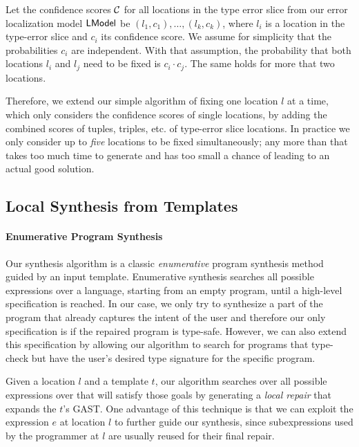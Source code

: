 Let the confidence scores $\mathcal{C}$ for all locations
in the type error slice from our error localization model $\mathsf{LModel}$ be
$(l_1, c_1), \dots, (l_k, c_k)$, where $l_i$ is a location in the type-error
slice and $c_i$ its confidence score. We assume for simplicity
that the probabilities $c_i$ are independent.
With that assumption, the probability that both locations $l_i$ and $l_j$
need to be fixed is $c_i \cdot c_j$. The same holds for more that two locations.

Therefore, we extend our simple algorithm of fixing one location $l$ at a time,
which only considers the confidence scores of single locations, by adding the
combined scores of tuples, triples, etc. of type-error slice locations. In
practice we only consider up to \emph{five} locations to be fixed
simultaneously; any more than that takes too much time to generate and
has too small a chance of leading to an actual good solution.


\subsection{Local Synthesis from Templates}
\label{subsec:local-synthesis}

\paragraph{Enumerative Program Synthesis}
Our synthesis algorithm is a classic \emph{enumerative} program synthesis method
guided by an input template. Enumerative synthesis searches all possible
expressions over a language, starting from an empty program, until a high-level
specification is reached. In our case, we only try to synthesize a part of the
program that already captures the intent of the user and therefore our only
specification is if the repaired program is type-safe. However, we can also
extend this specification by allowing our algorithm to search for programs that
type-check but have the user's desired type signature for the specific program.

Given a location $l$ and a template $t$, our algorithm searches over all
possible expressions over \lang that will satisfy those goals by generating a
\emph{local repair} that expands the $t$'s GAST. One advantage of this technique
is that we can exploit the expression $e$ at location $l$ to further guide our
synthesis, since subexpressions used by the programmer at $l$ are usually reused
for their final repair.

